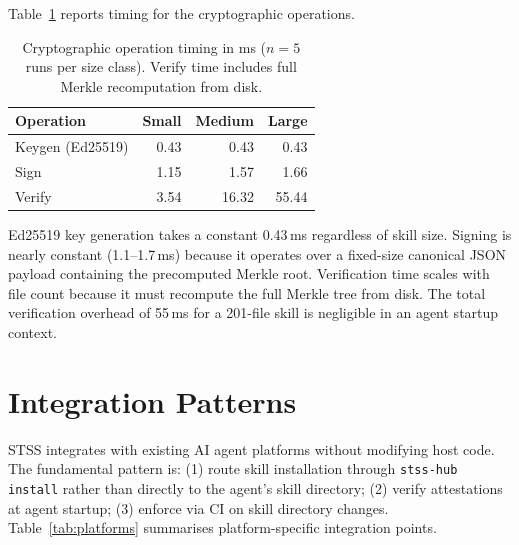 \documentclass[11pt,twocolumn]{article}
\begin{document}
Table~\ref{tab:crypto} reports timing for the cryptographic operations.

\begin{table}[h]
\centering
\caption{Cryptographic operation timing in ms ($n=5$ runs per size class).
  Verify time includes full Merkle recomputation from disk.}
\label{tab:crypto}
\renewcommand{\arraystretch}{1.1}
\scriptsize
\begin{tabular}{@{}lrrr@{}}
\toprule
\textbf{Operation} & \textbf{Small} & \textbf{Medium} & \textbf{Large} \\
\midrule
Keygen (Ed25519) & 0.43 & 0.43 & 0.43 \\
Sign             & 1.15 & 1.57 & 1.66 \\
Verify           & 3.54 & 16.32 & 55.44 \\
\bottomrule
\end{tabular}
\end{table}

Ed25519 key generation takes a constant 0.43\,ms regardless of skill size.
Signing is nearly constant (1.1--1.7\,ms) because it operates over a
fixed-size canonical JSON payload containing the precomputed Merkle root.
Verification time scales with file count because it must recompute the full
Merkle tree from disk. The total verification overhead of 55\,ms for a
201-file skill is negligible in an agent startup context.

\section{Integration Patterns}
\label{sec:integration}

STSS integrates with existing AI agent platforms without modifying host code.
The fundamental pattern is: (1) route skill installation through
\texttt{stss-hub install} rather than directly to the agent's skill directory;
(2) verify attestations at agent startup; (3) enforce via CI on skill directory
changes. Table~\ref{tab:platforms} summarises platform-specific integration points.
\end{document}
